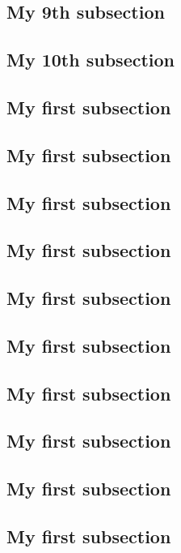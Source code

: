 \documentclass[fontsize=10pt,open=any,twocolumn]{scrbook}[2019/10/12]%
\begin{document}
        \subsection{My 9th subsection}
            \blindtext
        \subsection{My 10th subsection}
            \blindtext
        \subsection{My first subsection}
            \blindtext
        \subsection{My first subsection}
            \blindtext
        \subsection{My first subsection}
            \blindtext
        \subsection{My first subsection}
            \blindtext
        \subsection{My first subsection}
            \blindtext
        \subsection{My first subsection}
            \blindtext
        \subsection{My first subsection}
            \blindtext
        \subsection{My first subsection}
            \blindtext
        \subsection{My first subsection}
            \blindtext
        \subsection{My first subsection}
            \blindtext
\end{document}

